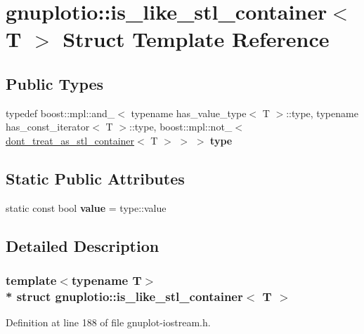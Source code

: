 \hypertarget{structgnuplotio_1_1is__like__stl__container}{}\section{gnuplotio\+:\+:is\+\_\+like\+\_\+stl\+\_\+container$<$ T $>$ Struct Template Reference}
\label{structgnuplotio_1_1is__like__stl__container}
\subsection*{Public Types}
\begin{DoxyCompactItemize}
\item 
typedef boost\+::mpl\+::and\+\_\+$<$ typename has\+\_\+value\+\_\+type$<$ T $>$\+::type, typename has\+\_\+const\+\_\+iterator$<$ T $>$\+::type, boost\+::mpl\+::not\+\_\+$<$ \hyperlink{structgnuplotio_1_1dont__treat__as__stl__container}{dont\+\_\+treat\+\_\+as\+\_\+stl\+\_\+container}$<$ T $>$ $>$ $>$ {\bfseries type}\hypertarget{structgnuplotio_1_1is__like__stl__container_a050ecfa55e896a27f86d901334f47c6a}{}\label{structgnuplotio_1_1is__like__stl__container_a050ecfa55e896a27f86d901334f47c6a}

\end{DoxyCompactItemize}
\subsection*{Static Public Attributes}
\begin{DoxyCompactItemize}
\item 
static const bool {\bfseries value} = type\+::value\hypertarget{structgnuplotio_1_1is__like__stl__container_ae4761e6e807deed732e41118c785c8a4}{}\label{structgnuplotio_1_1is__like__stl__container_ae4761e6e807deed732e41118c785c8a4}

\end{DoxyCompactItemize}


\subsection{Detailed Description}
\subsubsection*{template$<$typename T$>$\\*
struct gnuplotio\+::is\+\_\+like\+\_\+stl\+\_\+container$<$ T $>$}



Definition at line 188 of file gnuplot-\/iostream.\+h.

